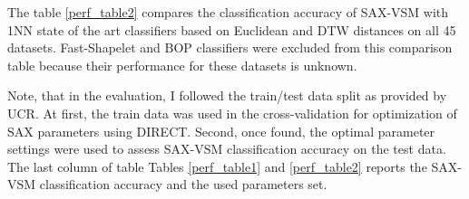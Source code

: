 The table \ref{perf_table2} compares the classification accuracy of SAX-VSM with 
1NN state of the art classifiers based on Euclidean and DTW distances on all 45 datasets. 
Fast-Shapelet and BOP classifiers were excluded from this comparison table because their 
performance for these datasets is unknown.

Note, that in the evaluation, I followed the train/test data split as provided by UCR. 
At first, the train data was used in the cross-validation for optimization of SAX parameters 
using \mbox{DIRECT}. Second, once found, the optimal parameter settings were used to assess SAX-VSM 
classification accuracy on the test data. 
The last column of table Tables \ref{perf_table1} and \ref{perf_table2} reports the SAX-VSM 
classification accuracy and the used parameters set.

\newpage


